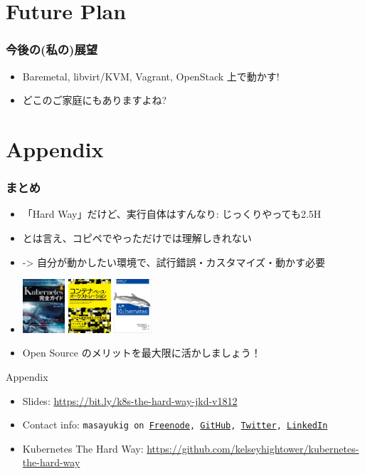\documentclass[aspectratio=169,11pt,hyperref={colorlinks=true}]{beamer}
\begin{document}
\section{Future Plan}
\begin{frame}
  \frametitle{今後の(私の)展望}
  \begin{itemize}
    \item Baremetal, libvirt/KVM, Vagrant, OpenStack 上で動かす!
    \item[] どこのご家庭にもありますよね?
  \end{itemize}
\end{frame}

\section{Appendix}
\begin{frame}
  \frametitle{まとめ}
  \begin{itemize}
    \item 「Hard Way」だけど、実行自体はすんなり: じっくりやっても2.5H
    \item とは言え、コピペでやっただけでは理解しきれない
    \item[] -> 自分が動かしたい環境で、試行錯誤・カスタマイズ・動かす必要
    \item[] \includegraphics[height=20mm]{images/kubernetes_complete_guide.jpg}
       \includegraphics[height=20mm]{images/container_based_orchestration.jpg}
       \includegraphics[height=20mm]{images/kubernetes_up_and_running.jpeg}
    \item Open Source のメリットを最大限に活かしましょう！
  \end{itemize}
  Appendix
  \begin{itemize}
      \item Slides: \url{https://bit.ly/k8s-the-hard-way-jkd-v1812}
      \item Contact info: \texttt{masayukig on
        \href{https://freenode.net/}{Freenode},
        \href{https://github.com/masayukig}{GitHub},
        \href{https://twitter.com/masayukig}{Twitter},
        \href{https://www.linkedin.com/in/masayukig/}{LinkedIn}}
      \item Kubernetes The Hard Way: \url{https://github.com/kelseyhightower/kubernetes-the-hard-way}
  \end{itemize}
\end{frame}
\end{document}
